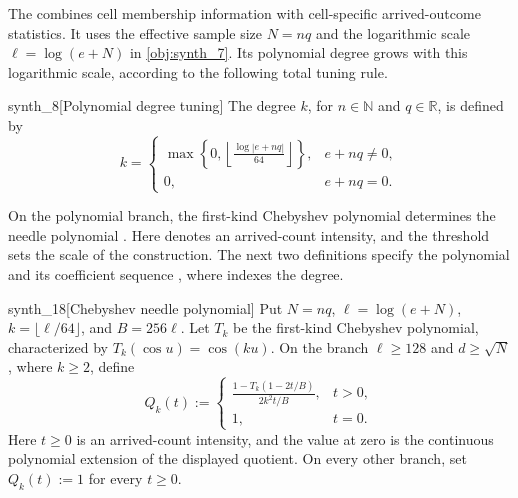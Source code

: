 The  combines cell membership information with cell-specific arrived-outcome statistics. It uses the effective sample size \(N=nq\) and the logarithmic scale \(\ell=\log(e+N)\) in \cref{obj:synth_7}. Its polynomial degree  grows with this logarithmic scale, according to the following total tuning rule.

\begin{definitionv}{synth_8}[Polynomial degree tuning]
The degree \(k\), for \(n\in\mathbb N\) and \(q\in\mathbb R\), is defined by
\[
k=
\begin{cases}
\displaystyle \max\left\{0,\left\lfloor\frac{\log|e+nq|}{64}\right\rfloor\right\},
& e+nq\ne 0,\\
0, & e+nq=0.
\end{cases}
\]
\end{definitionv}

On the polynomial branch, the first-kind Chebyshev polynomial  determines the needle polynomial . Here  denotes an arrived-count intensity, and the threshold  sets the scale of the construction. The next two definitions specify the polynomial and its coefficient sequence , where  indexes the degree.

\begin{definitionv}{synth_18}[Chebyshev needle polynomial]
Put \(N=nq\), \(\ell=\log(e+N)\), \(k=\lfloor\ell/64\rfloor\), and \(B=256\ell\). Let \(T_k\) be the first-kind Chebyshev polynomial, characterized by \(T_k(\cos u)=\cos(ku)\). On the branch \(\ell\ge128\) and \(d\ge\sqrt N\), where \(k\ge2\), define
\[
Q_k(t):=
\begin{cases}
\displaystyle\frac{1-T_k(1-2t/B)}{2k^2t/B},&t>0,\\[6pt]
1,&t=0.
\end{cases}
\]
Here \(t\ge0\) is an arrived-count intensity, and the value at zero is the continuous polynomial extension of the displayed quotient. On every other branch, set \(Q_k(t):=1\) for every \(t\ge0\).
\end{definitionv}

